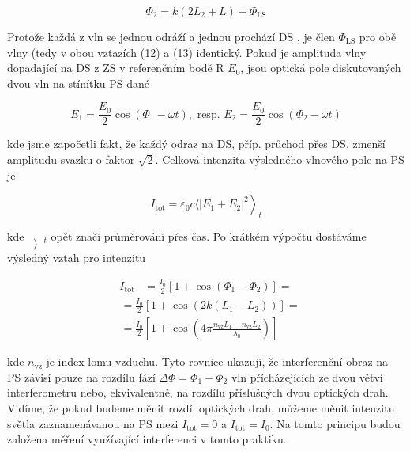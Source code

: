 \documentclass[czech,11pt,a4paper]{article}
\begin{document}
\begin{multicols}{2}
	\begin{equation}
		\Phi_{2}=k\left(2 L_{2}+L\right)+\Phi_{\mathrm{LS}}
	\end{equation}
	
	
	Protože každá z vln se jednou odráží a jednou prochází DS , je člen $\Phi_{\mathrm{LS}}$ pro obě vlny (tedy v obou vztazích (12) a (13) identický. Pokud je amplituda vlny dopadající na DS z ZS v referenčním bodě R $E_{0}$, jsou optická pole diskutovaných dvou vln na stínítku PS dané
	
	\begin{equation}
		E_{1}=\frac{E_{0}}{2} \cos \left(\Phi_{1}-\omega t\right), \text { resp. } E_{2}=\frac{E_{0}}{2} \cos \left(\Phi_{2}-\omega t\right)
	\end{equation}
	
	kde jsme započetli fakt, že každý odraz na DS, příp. průchod přes DS, zmenší amplitudu svazku o faktor $\sqrt{2}$. Celková intenzita výsledného vlnového pole na PS je
	
	
	\begin{equation}
		\left.I_{\mathrm{tot}}=\varepsilon_{0} c\langle | E_{1}+\left.E_{2}\right|^{2}\right\rangle_{t}
	\end{equation}
	
	
	kde $\left\rangle_{t}\right.$ opět značí průměrování přes čas. Po krátkém výpočtu dostáváme výsledný vztah pro intenzitu
	
	\begin{align}
		I_{\mathrm{tot}} &=\frac{I_{0}}{2}\left[1+\cos \left(\Phi_{1}-\Phi_{2}\right)\right]= 
	\end{align}
	\begin{align*}
		& =\frac{I_{0}}{2}\left[1+\cos \left(2 k\left(L_{1}-L_{2}\right)\right)\right]= \\
		& =\frac{I_{0}}{2}\left[1+\cos \left(4 \pi \frac{n_{\mathrm{vz}} L_{1}-n_{\mathrm{vz}} L_{2}}{\lambda_{0}}\right)\right]
	\end{align*}
	
	
	kde $n_{\mathrm{vz}}$ je index lomu vzduchu. Tyto rovnice ukazují, že interferenční obraz na PS závisí pouze na rozdílu fází $\Delta \Phi=\Phi_{1}-\Phi_{2}$ vln přícházejících ze dvou větví interferometru nebo, ekvivalentně, na rozdílu příslušných dvou optických drah. Vidíme, že pokud budeme mĕnit rozdíl optických drah, můžeme měnit intenzitu světla zaznamenávanou na PS mezi $I_{\mathrm{tot}}=0$ a $I_{\mathrm{tot}}=I_{0}$. Na tomto principu budou založena měření využívající interferenci v tomto praktiku.
	

\end{multicols}
\end{document}
